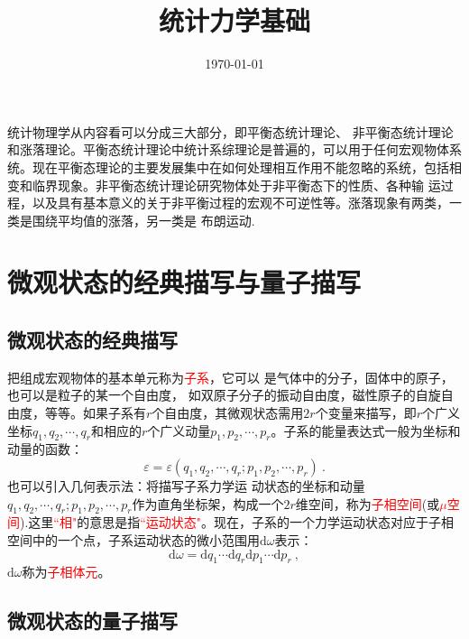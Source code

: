 \documentclass[12pt,a4paper]{article}
\title{统计力学基础}
\author{}
\date{\today}
\newcommand{\dif}{\mathrm{d}}
\begin{document}
\maketitle
统计物理学从内容看可以分成三大部分，即平衡态统计理论、 非平衡态统计理论和涨落理论。平衡态统计理论中统计系综理论是普遍的，可以用于任何宏观物体系统。现在平衡态理论的主要发展集中在如何处理相互作用不能忽略的系统，包括相变和临界现象。非平衡态统计理论研究物体处于非平衡态下的性质、各种输 运过程，以及具有基本意义的关于非平衡过程的宏观不可逆性等。涨落现象有两类，一类是围绕平均值的涨落，另一类是 布朗运动.

\section{微观状态的经典描写与量子描写}

\subsection{微观状态的经典描写}
把组成宏观物体的基本单元称为\textcolor{red}{子系}，它可以 是气体中的分子，固体中的原子，也可以是粒子的某一个自由度， 如双原子分子的振动自由度，磁性原子的自旋自由度，等等。如果子系有$r$个自由度，其微观状态需用$2r$个变量来描写，即$r$个广义坐标$q_1, q_2, \cdots, q_r$和相应的$r$个广义动量$p_1, p_2, \cdots, p_r$。子系的能量表达式一般为坐标和动量的函数：
\begin{equation}
\varepsilon = \varepsilon(q_1, q_2, \cdots, q_r; p_1, p_2, \cdots, p_r) ~.
\end{equation}
也可以引入几何表示法：将描写子系力学运 动状态的坐标和动量$q_1, q_2, \cdots, q_r; p_1, p_2, \cdots, p_r$作为直角坐标架，构成一个$2r$维空间，称为\textcolor{red}{子相空间}(或\textcolor{red}{$\mu$空间}).这里\textcolor{red}{``相"}的意思是指\textcolor{red}{``运动状态"}。现在，子系的一个力学运动状态对应于子相空间中的一个点，子系运动状态的微小范围用$\dif \omega$表示：
\begin{equation}
\dif \omega = \dif q_1 \cdots \dif  q_r \dif p_1 \cdots \dif  p_r ~,
\end{equation}
$\dif \omega$称为\textcolor{red}{子相体元}。











\subsection{微观状态的量子描写}
\end{document}
